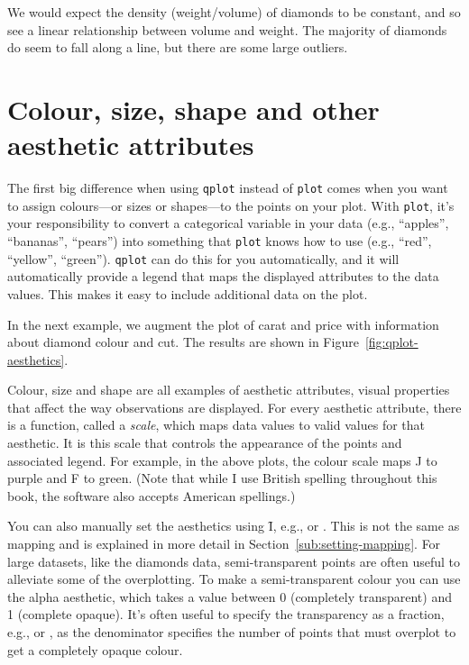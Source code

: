 % 


We would expect the density (weight/volume) of diamonds to be constant, and so see a linear relationship between volume and weight. The majority of diamonds do seem to fall along a line, but there are some large outliers.

\section{Colour, size, shape and other aesthetic attributes}
\label{sec:aesthetic_attributes}

The first big difference when using {\tt qplot} instead of {\tt plot} comes when you want to assign colours---or sizes or shapes---to the points on your plot.  With {\tt plot}, it's your responsibility to convert a categorical variable in your data (e.g., ``apples'', ``bananas'', ``pears'') into something that {\tt plot} knows how to use (e.g., ``red'', ``yellow'', ``green'').  {\tt qplot} can do this for you automatically, and it will automatically provide a legend that maps the displayed attributes to the data values.  This makes it easy to include additional data on the plot.  

In the next example, we augment the plot of carat and price with information about diamond colour and cut.  The results are shown in Figure~\ref{fig:qplot-aesthetics}.

% 


Colour, size and shape are all examples of aesthetic attributes, visual properties that affect the way observations are displayed. For every aesthetic attribute, there is a function, called a \emph{scale}, which maps data values to valid values for that aesthetic. It is this scale that controls the appearance of the points and associated legend. For example, in the above plots, the colour scale maps J to purple and F to green. (Note that while I use British spelling throughout this book, the software also accepts American spellings.)

You can also manually set the aesthetics using \f{I}, e.g.,  or .  This is not the same as mapping and is explained in more detail in Section~\ref{sub:setting-mapping}.  For large datasets, like the diamonds data, semi-transparent points are often useful to alleviate some of the overplotting.  To make a semi-transparent colour you can use the alpha aesthetic, which takes a value between 0 (completely transparent) and 1 (complete opaque).  It's often useful to specify the transparency as a fraction, e.g.,  or , as the denominator specifies the number of points that must overplot to get a completely opaque colour.  

